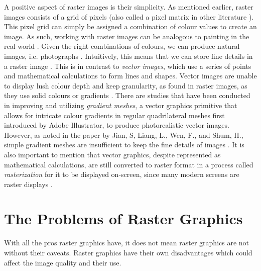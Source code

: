 A positive aspect of raster images is their simplicity. As mentioned earlier, raster images consists of a grid of pixels (also called a pixel matrix in other literature \cite{realtimevectorizationgpu}). This pixel grid can simply be assigned a combination of colour values to create an image. As such, working with raster images can be analogous to painting in the real world \cite{rastervsvector}. Given the right combinations of colours, we can produce natural images, i.e. photographs \cite{hoshyari2018perceptiondriven}. Intuitively, this means that we can store fine details in a raster image \cite{optimizedgradientmeshes}. This is in contrast to \textit{vector images}, which use a series of points and mathematical calculations to form lines and shapes. Vector images are unable to display lush colour depth and keep granularity, as found in raster images, as they use solid colours or gradients  \cite{rastervsvector}\cite{rastervsvectorgraphics}. There are studies that have been conducted in improving and utilizing \textit{gradient meshes}, a vector graphics primitive that allows for intricate colour gradients in regular quadrilateral meshes first introduced by Adobe Illustrator, to produce photorealistic vector images. However, as noted in the paper by Jian, S, Liang, L., Wen, F., and Shum, H., simple gradient meshes are insufficient to keep the fine details of images \cite{barendrecht2018locally}\cite{optimizedgradientmeshes}. It is also important to mention that vector graphics, despite represented as mathematical calculations, are still converted to raster format in a process called \textit{rasterization} for it to be displayed on-screen, since many modern screens are raster displays \cite{howdovectorgraphicswork}.

\section{The Problems of Raster Graphics}
With all the pros raster graphics have, it does not mean raster graphics are not without their caveats. Raster graphics have their own disadvantages which could affect the image quality and their use.

